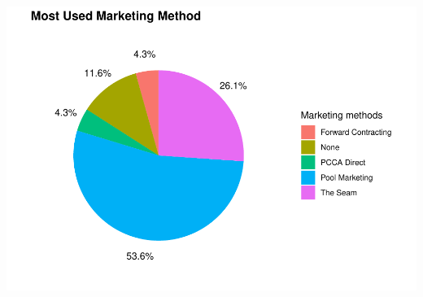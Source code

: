 \documentclass[
]{article}
\begin{document}
\includegraphics{pcca_survey_files/figure-latex/marketing-young-1.pdf}
\end{document}
